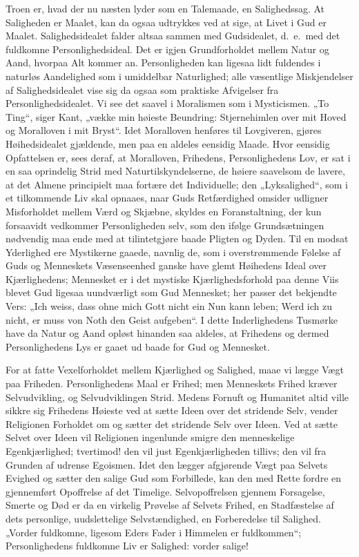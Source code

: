 \documentclass[12pt]{book}
\begin{document}
Troen er, hvad der nu næsten lyder som en Talemaade, en
Salighedssag. At Saligheden er Maalet, kan da ogsaa udtrykkes ved at
sige, at Livet i Gud er Maalet. Salighedsidealet falder altsaa
sammen med Gudsidealet, d.\ e.\ med det fuldkomne
Personlighedsideal. Det er igjen Grundforholdet mellem Natur og
Aand, hvorpaa Alt kommer an. Personligheden kan ligesaa lidt
fuldendes i naturløs Aandelighed som i umiddelbar Naturlighed; alle
væsentlige Miskjendelser af Salighedsidealet vise sig da ogsaa som
praktiske Afvigelser fra Personlighedsidealet. Vi see det saavel i
Moralismen som i Mysticismen. „To
Ting“, siger Kant, „vække min høieste Beundring: Stjernehimlen over
mit Hoved og Moralloven i mit Bryst“. Idet Moralloven henføres til
Lovgiveren, gjøres Høihedsidealet gjældende, men paa en aldeles
eensidig Maade. Hvor eensidig Opfattelsen er, sees deraf, at
Moralloven, Frihedens, Personlighedens Lov, er sat i en saa
oprindelig Strid med Naturtilskyndelserne, de høiere saavelsom de
lavere, at det Almene principielt maa fortære det Individuelle; den
„Lyksalighed“, som i et tilkommende Liv skal opnaaes, naar Guds
Retfærdighed omsider udligner Misforholdet mellem Værd og Skjæbne,
skyldes en Foranstaltning, der kun forsaavidt vedkommer
Personligheden selv, som den ifølge Grundsætningen nødvendig maa
ende med at tilintetgjøre baade Pligten og Dyden. Til en modsat
Yderlighed ere Mystikerne gaaede, navnlig de, som i overstrømmende
Følelse af Guds og Menneskets Væsenseenhed ganske have glemt
Høihedens Ideal over Kjærlighedens; Mennesket er i det mystiske
Kjærlighedsforhold paa denne Viis blevet Gud ligesaa uundværligt som
Gud Mennesket; her passer det bekjendte Vers:
„Ich weiss, dass ohne mich Gott nicht ein Nun kann leben; Werd ich
zu nicht, er muss von Noth den Geist aufgeben“. I dette
Inderlighedens Tusmørke have da Natur og Aand opløst hinanden saa
aldeles, at Frihedens og dermed Personlighedens Lys er gaaet ud
baade for Gud og Mennesket.

For at fatte Vexelforholdet mellem Kjærlighed og Salighed, maae vi
lægge Vægt paa Friheden. Personlighedens Maal er Frihed; men
Menneskets Frihed kræver Selvudvikling, og Selvudviklingen Strid.
Medens Fornuft og Humanitet altid ville sikkre sig Frihedens Høieste
ved at sætte Ideen over det stridende Selv, vender Religionen
Forholdet om og sætter det stridende Selv over Ideen. Ved at sætte
Selvet over Ideen vil Religionen ingenlunde smigre den menneskelige
Egenkjærlighed; tvertimod! den vil just
Egenkjærligheden tillivs; den vil fra Grunden af udrense Egoismen.
Idet den lægger afgjørende Vægt paa Selvets Evighed og sætter den
salige Gud som Forbillede, kan den med Rette fordre en gjennemført
Opoffrelse af det Timelige. Selvopoffrelsen gjennem Forsagelse,
Smerte og Død er da en virkelig Prøvelse af Selvets Frihed, en
Stadfæstelse af dets personlige, uudslettelige Selvstændighed, en
Forberedelse til Salighed. „Vorder fuldkomne, ligesom Eders Fader i
Himmelen er fuldkommen“; Personlighedens fuldkomne Liv er Salighed:
vorder salige!
\end{document}
